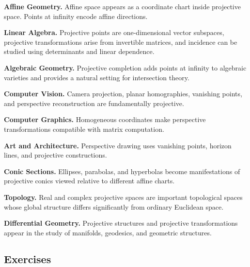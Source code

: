 \begin{applicationbox}
\textbf{Affine Geometry.}
Affine space appears as a coordinate chart inside projective space. Points at
infinity encode affine directions.

\medskip

\textbf{Linear Algebra.}
Projective points are one-dimensional vector subspaces, projective
transformations arise from invertible matrices, and incidence can be studied
using determinants and linear dependence.

\medskip

\textbf{Algebraic Geometry.}
Projective completion adds points at infinity to algebraic varieties and
provides a natural setting for intersection theory.

\medskip

\textbf{Computer Vision.}
Camera projection, planar homographies, vanishing points, and perspective
reconstruction are fundamentally projective.

\medskip

\textbf{Computer Graphics.}
Homogeneous coordinates make perspective transformations compatible with
matrix computation.

\medskip

\textbf{Art and Architecture.}
Perspective drawing uses vanishing points, horizon lines, and projective
constructions.

\medskip

\textbf{Conic Sections.}
Ellipses, parabolas, and hyperbolas become manifestations of projective
conics viewed relative to different affine charts.

\medskip

\textbf{Topology.}
Real and complex projective spaces are important topological spaces whose
global structure differs significantly from ordinary Euclidean space.

\medskip

\textbf{Differential Geometry.}
Projective structures and projective transformations appear in the study of
manifolds, geodesics, and geometric structures.
\end{applicationbox}

\subsection{Exercises}
\label{subsec:projective-exercises}

